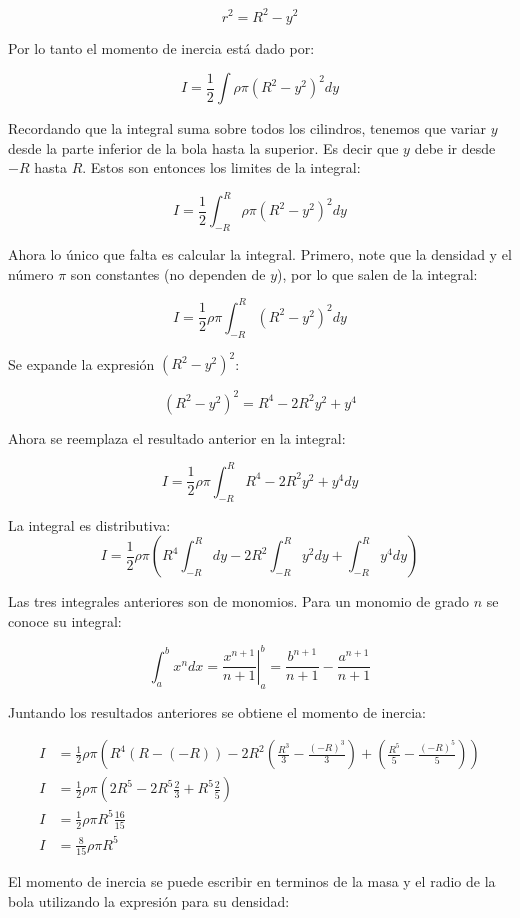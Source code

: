 \documentclass[a4paper,11pt]{article}
\begin{document}
$$ r^2 = R^2 - y^2$$

Por lo tanto el momento de inercia está dado por:

$$ I = \frac{1}{2} \int \rho \pi   (R^2-y^2)^2 dy$$

Recordando que la integral suma sobre todos los cilindros, tenemos que variar $y$ desde la parte inferior de la bola hasta la superior. Es decir que $y$ debe ir desde $-R$ hasta $R$. Estos son entonces los limites de la integral:

$$ I = \frac{1}{2} \int_{-R}^{R} \rho \pi   (R^2-y^2)^2 dy$$

Ahora lo único que falta es calcular la integral. Primero, note que la densidad y el número $\pi$ son constantes (no dependen de $y$), por lo que salen de la integral:

$$ I = \frac{1}{2} \rho \pi \int_{-R}^{R}    (R^2-y^2)^2 dy$$

Se expande la expresión $(R^2-y^2)^2$:

$$ (R^2-y^2)^2 = R^4 -2 R^2 y^2 + y^4$$

Ahora se reemplaza el resultado anterior en la integral:

$$ I = \frac{1}{2} \rho \pi \int_{-R}^{R}  R^4 -2 R^2 y^2 + y^4   dy$$

La integral es distributiva:
$$ I = \frac{1}{2} \rho \pi \left(  R^4\int_{-R}^{R} dy -2 R^2 \int_{-R}^{R} y^2 dy + \int_{-R}^{R}y^4   dy\right)$$

Las tres integrales anteriores son de monomios. Para un monomio de grado $n$ se conoce su integral:

$$ \int_{a}^{b} x^{n} dx = \left.\frac{x^{n+1}}{n+1}\right|_{a}^{b} = \frac{b^{n+1}}{n+1} - \frac{a^{n+1}}{n+1}$$

Juntando los resultados anteriores se obtiene el momento de inercia:

\begin{align*}
I &= \frac{1}{2} \rho \pi \left(  R^4(R-(-R))  -2 R^2 \left( \frac{R^3}{3}-\frac{(-R)^3}{3}\right)  + \left( \frac{R^5}{5}-\frac{(-R)^5}{5}\right)\right) \\
I  &=\frac{1}{2} \rho \pi \left(  2R^5 -2 R^5 \frac{2}{3}  + R^5 \frac{2}{5}\right)\\
I & = \frac{1}{2} \rho \pi R^5 \frac{16}{15}\\
I & = \frac{8}{15} \rho \pi R^5
\end{align*} 

El momento de inercia se puede escribir en terminos de la masa y el radio de la bola utilizando la expresión para su densidad:
\end{document}
